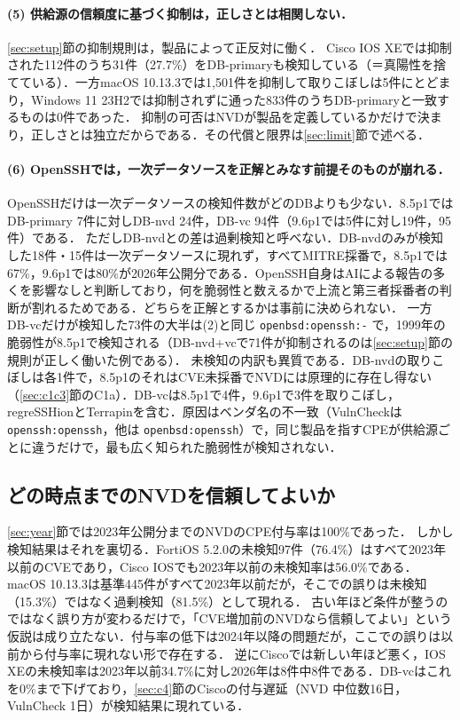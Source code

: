 \paragraph{(5) 供給源の信頼度に基づく抑制は，正しさとは相関しない．}
\ref{sec:setup}節の抑制規則は，製品によって正反対に働く．
Cisco IOS XEでは抑制された112件のうち31件（27.7\%）をDB-primaryも検知している（＝真陽性を捨てている）．一方macOS 10.13.3では1,501件を抑制して取りこぼしは5件にとどまり，Windows 11 23H2では抑制されずに通った833件のうちDB-primaryと一致するものは0件であった．
抑制の可否はNVDが製品を定義しているかだけで決まり，正しさとは独立だからである．その代償と限界は\ref{sec:limit}節で述べる．

\paragraph{(6) OpenSSHでは，一次データソースを正解とみなす前提そのものが崩れる．}
OpenSSHだけは一次データソースの検知件数がどのDBよりも少ない．8.5p1ではDB-primary 7件に対しDB-nvd 24件，DB-vc 94件（9.6p1では5件に対し19件，95件）である．
ただしDB-nvdとの差は過剰検知と呼べない．DB-nvdのみが検知した18件・15件は一次データソースに現れず，すべてMITRE採番で，8.5p1では67\%，9.6p1では80\%が2026年公開分である．OpenSSH自身はAIによる報告の多くを影響なしと判断しており\cite{openssh-rel105}，何を脆弱性と数えるかで上流と第三者採番者の判断が割れるためである．どちらを正解とするかは事前に決められない．
一方DB-vcだけが検知した73件の大半は(2)と同じ \texttt{openbsd:openssh:-} で，1999年の脆弱性が8.5p1で検知される（DB-nvd+vcで71件が抑制されるのは\ref{sec:setup}節の規則が正しく働いた例である）．
未検知の内訳も異質である．DB-nvdの取りこぼしは各1件で，8.5p1のそれはCVE未採番でNVDには原理的に存在し得ない（\ref{sec:c1c3}節のC1a）．DB-vcは8.5p1で4件，9.6p1で3件を取りこぼし，regreSSHionとTerrapinを含む．原因はベンダ名の不一致（VulnCheckは \texttt{openssh:openssh}，他は \texttt{openbsd:openssh}）で，同じ製品を指すCPEが供給源ごとに違うだけで，最も広く知られた脆弱性が検知されない．

\subsection{どの時点までのNVDを信頼してよいか}
\label{sec:trust}

\ref{sec:year}節では2023年公開分までのNVDのCPE付与率は100\%であった．
しかし検知結果はそれを裏切る．FortiOS 5.2.0の未検知97件（76.4\%）はすべて2023年以前のCVEであり，Cisco IOSでも2023年以前の未検知率は56.0\%である．
macOS 10.13.3は基準445件がすべて2023年以前だが，そこでの誤りは未検知（15.3\%）ではなく過剰検知（81.5\%）として現れる．
古い年ほど条件が整うのではなく誤り方が変わるだけで，「CVE増加前のNVDなら信頼してよい」という仮説は成り立たない．付与率の低下は2024年以降の問題だが，ここでの誤りは以前から付与率に現れない形で存在する．
逆にCiscoでは新しい年ほど悪く，IOS XEの未検知率は2023年以前34.7\%に対し2026年は8件中8件である．DB-vcはこれを0\%まで下げており，\ref{sec:c4}節のCiscoの付与遅延（NVD 中位数16日，VulnCheck 1日）が検知結果に現れている．

